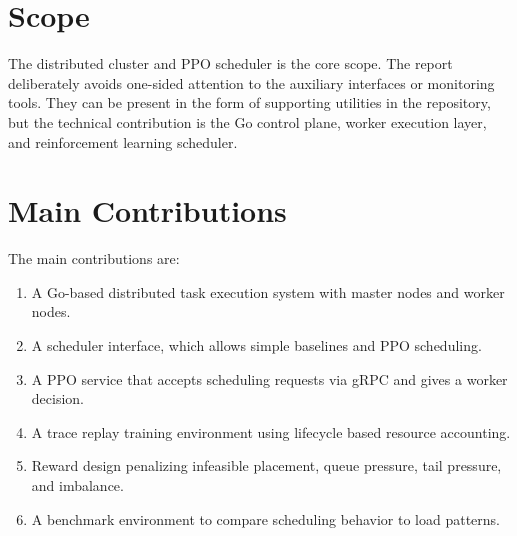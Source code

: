 \section{Scope}

The distributed cluster and PPO scheduler is the core scope. The report deliberately avoids one-sided attention to the auxiliary interfaces or monitoring tools. They can be present in the form of supporting utilities in the repository, but the technical contribution is the Go control plane, worker execution layer, and reinforcement learning scheduler.

\section{Main Contributions}

The main contributions are:

\begin{enumerate}
    \item A Go-based distributed task execution system with master nodes and worker nodes.
    \item A scheduler interface, which allows simple baselines and PPO scheduling.
    \item A PPO service that accepts scheduling requests via gRPC and gives a worker decision.
    \item A trace replay training environment using lifecycle based resource accounting.
    \item Reward design penalizing infeasible placement, queue pressure, tail pressure, and imbalance.
    \item A benchmark environment to compare scheduling behavior to load patterns.
\end{enumerate}